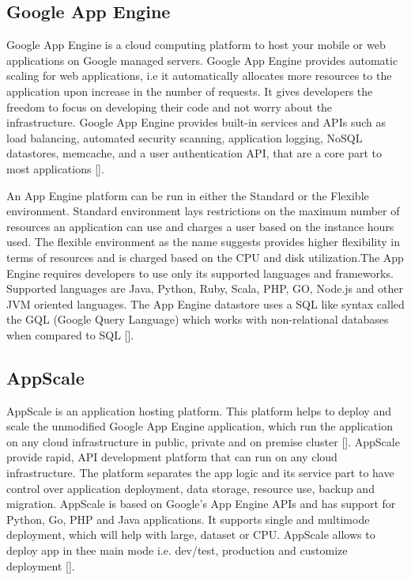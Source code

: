 \subsection{Google App Engine}

Google App Engine is a cloud computing platform to host your mobile or
web applications on Google managed servers. Google App Engine provides
automatic scaling for web applications, i.e it automatically allocates
more resources to the application upon increase in the number of
requests. It gives developers the freedom to focus on developing their
code and not worry about the infrastructure. Google App Engine
provides built-in services and APIs such as load balancing, automated
security scanning, application logging, NoSQL datastores, memcache,
and a user authentication API, that are a core part to most
applications [\cite{www-appengine-google}].
     
An App Engine platform can be run in either the Standard or the
Flexible environment. Standard environment lays restrictions on the
maximum number of resources an application can use and charges a user
based on the instance hours used. The flexible environment as the name
suggests provides higher flexibility in terms of resources and is
charged based on the CPU and disk utilization.The App Engine requires
developers to use only its supported languages and
frameworks. Supported languages are Java, Python, Ruby, Scala, PHP,
GO, Node.js and other JVM oriented languages. The App Engine datastore
uses a SQL like syntax called the GQL (Google Query Language) which
works with non-relational databases when compared to
SQL [\cite{www-wiki-appengine}].
    
\subsection{AppScale}

AppScale is an application hosting platform. This platform helps to
deploy and scale the unmodified Google App Engine application, which
run the application on any cloud infrastructure in public, private and
on premise cluster [\cite{www-appscale}]. AppScale provide rapid, API
development platform that can run on any cloud infrastructure. The
platform separates the app logic and its service part to have control
over application deployment, data storage, resource use, backup and
migration.  AppScale is based on Google's App Engine APIs and has
support for Python, Go, PHP and Java applications. It supports single
and multimode deployment, which will help with large, dataset or
CPU. AppScale allows to deploy app in thee main mode i.e. dev/test,
production and customize deployment [\cite{www-appscale-deployment}].

